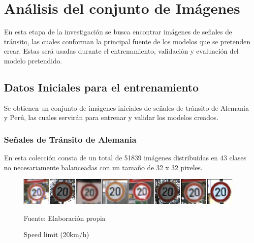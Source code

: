 \section{Análisis del conjunto de Imágenes}
	
	En esta etapa de la investigación se busca encontrar imágenes de señales de tránsito, las cuales conforman la principal fuente de los modelos que se pretenden crear. Estas será usadas durante el entrenamiento, validación y evaluación del modelo pretendido.
	
	\subsection{Datos Iniciales para el entrenamiento}
		Se obtienen un conjunto de imágenes iniciales de señales de tránsito de Alemania y Perú, las cuales servirán para entrenar y validar los modelos creados.
		\subsubsection{Señales de Tránsito de Alemania}

			En esta colección consta de un total de 51839 imágenes distribuidas en 43 clases no necesariamente balanceadas con un tamaño de 32 x 32 pixeles.

			\begin{figure}[H]
				\begin{center}
				\includegraphics[width=1\textwidth]{images/desarrollo/imagenes/alemania/1__(1).png}
				\end{center}
				\begin{center}
				\caption{\small{Speed limit (20km/h)}}
				\vskip -0.25cm
				{\small{Fuente: Elaboración propia}}
				\end{center}
				\vspace{-1.5em}
			\end{figure}



